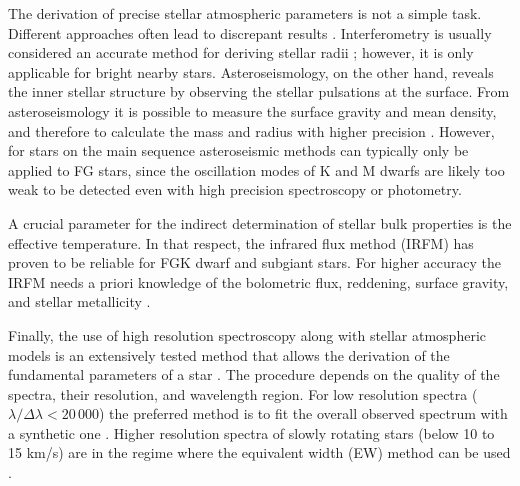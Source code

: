 \documentclass{aa}
\begin{document}
The derivation of precise stellar atmospheric parameters is not a simple task.
Different approaches often lead to discrepant results
\citep[see e.g.][]{Santos13}. Interferometry is usually considered  an accurate
method for deriving stellar radii \citep[see e.g.][]{Boyajian2012}; however, it is
only applicable for bright nearby stars. Asteroseismology, on the other hand,
reveals the inner stellar structure by observing the stellar pulsations at the
surface. From asteroseismology it is possible to measure the surface gravity and
mean density, and therefore to calculate the mass and radius with higher
precision \citep[e.g.][]{Kjeldsen1995}. However, for stars on the main sequence
asteroseismic methods can typically only be applied to FG stars, since the
oscillation modes of K and M dwarfs are likely too weak to be detected even with
high precision spectroscopy or photometry.

A crucial parameter for the indirect determination of stellar bulk properties is
the effective temperature. In that respect, the infrared flux method (IRFM) has
proven to be reliable for FGK dwarf and subgiant stars. For higher accuracy the
IRFM needs a priori knowledge of the bolometric flux, reddening, surface
gravity, and stellar metallicity
\citep{Blackwell1977,Ramirez2005b,Casagrande2010}.

Finally, the use of high resolution spectroscopy along with stellar atmospheric
models is an extensively tested method that allows the derivation of the
fundamental parameters of a star \citep[see e.g.][]{Valenti2005,Santos13}. The
procedure depends on the quality of the spectra, their resolution, and
wavelength region. For low resolution spectra ($\lambda/\Delta\lambda <
20\,000$) the preferred method is to fit the overall observed spectrum with a
synthetic one \citep[see e.g.][]{Recio2006}. Higher resolution spectra of slowly
rotating stars (below 10 to 15 \si{km/s}) are in the regime where the
equivalent width (EW) method can be used
\citep[see e.g.][for details]{Andreasen2017a,Tsantaki2017}.
\end{document}
